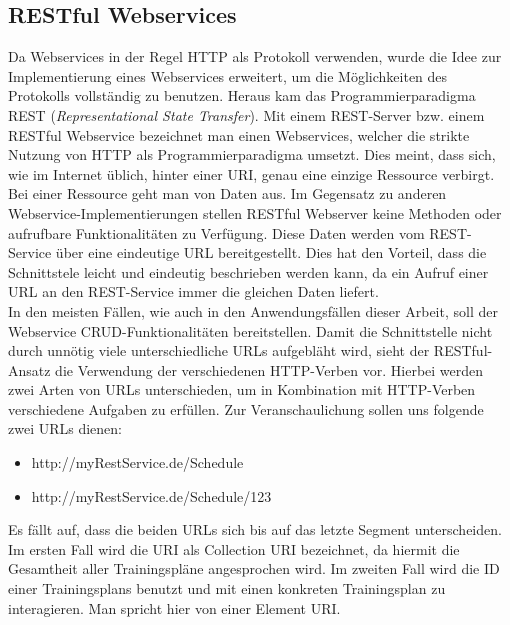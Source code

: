 \subsection{RESTful Webservices}
\label{sec:definition-rest}
Da Webservices in der Regel \ac{HTTP} als Protokoll verwenden, wurde die Idee zur Implementierung eines Webservices erweitert, um die Möglichkeiten des Protokolls vollständig zu benutzen. Heraus kam das Programmierparadigma REST (\textit{Representational State Transfer}). Mit einem REST-Server bzw. einem RESTful Webservice bezeichnet man einen Webservices, welcher die strikte Nutzung von HTTP als Programmierparadigma umsetzt.  Dies meint, dass sich, wie im Internet üblich, hinter einer \ac{URI}, genau eine einzige Ressource verbirgt. Bei einer Ressource geht man von Daten aus. Im Gegensatz zu anderen Webservice-Implementierungen stellen RESTful Webserver keine Methoden oder aufrufbare Funktionalitäten zu Verfügung. Diese Daten werden vom REST-Service über eine eindeutige URL bereitgestellt. Dies hat den Vorteil, dass die Schnittstele leicht und eindeutig beschrieben werden kann, da ein Aufruf einer URL an den REST-Service immer die gleichen Daten liefert. \\
In den meisten Fällen, wie auch in den Anwendungsfällen dieser Arbeit, soll der Webservice \ac{CRUD}-Funktionalitäten bereitstellen. Damit die Schnittstelle nicht durch unnötig viele unterschiedliche URLs aufgebläht wird, sieht der RESTful-Ansatz die Verwendung der verschiedenen HTTP-Verben vor. Hierbei werden zwei Arten von URLs unterschieden, um in Kombination mit HTTP-Verben verschiedene Aufgaben zu erfüllen. Zur Veranschaulichung sollen uns folgende zwei URLs dienen:
\begin{itemize}
\item http://myRestService.de/Schedule
\item http://myRestService.de/Schedule/123
\end{itemize}
Es fällt auf, dass die beiden URLs sich bis auf das letzte Segment unterscheiden. Im ersten Fall wird die URI als Collection URI bezeichnet, da hiermit die Gesamtheit aller Trainingspläne angesprochen wird. Im zweiten Fall wird die ID einer Trainingsplans benutzt und mit einen konkreten Trainingsplan zu interagieren. Man spricht hier von einer Element URI.\cite[S. 12ff.]{Building-a-REST-Service}

